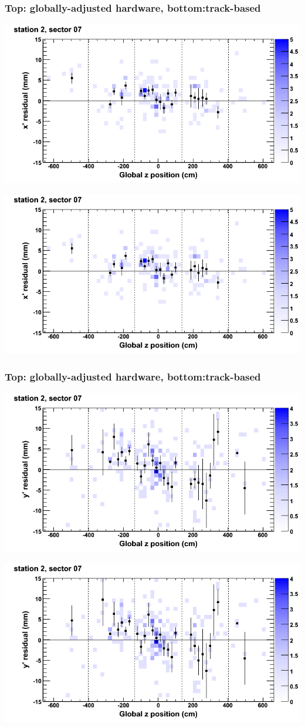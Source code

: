 \documentclass[compress]{beamer}
\begin{document}
\begin{frame}
\frametitle{Top: globally-adjusted hardware, bottom:track-based}
\includegraphics[width=0.7\linewidth]{NOV4_mapplots_HW/DTvsz_st2sec07_x.png}

\includegraphics[width=0.7\linewidth]{NOV4_mapplots/DTvsz_st2sec07_x.png}
\end{frame}

\begin{frame}
\frametitle{Top: globally-adjusted hardware, bottom:track-based}
\includegraphics[width=0.7\linewidth]{NOV4_mapplots_HW/DTvsz_st2sec07_y.png}

\includegraphics[width=0.7\linewidth]{NOV4_mapplots/DTvsz_st2sec07_y.png}
\end{frame}
\end{document}
